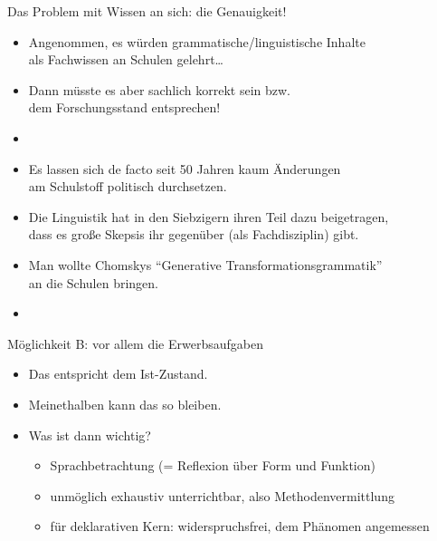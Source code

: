 \begin{frame}
  {Das Problem mit Wissen an sich: die Genauigkeit!}
  \pause
  \begin{itemize}[<+->]
    \item Angenommen, es würden grammatische\slash linguistische Inhalte\\
      als Fachwissen an Schulen gelehrt\ldots
    \item \alert{Dann müsste es aber sachlich korrekt sein bzw.\\
      dem Forschungsstand entsprechen!}
      \Halbzeile
    \item {}
      \Zeile
    \item Es lassen sich de facto seit 50 Jahren kaum Änderungen\\
      am Schulstoff politisch durchsetzen.
    \item Die Linguistik hat in den Siebzigern ihren Teil dazu beigetragen,\\
      dass es große Skepsis ihr gegenüber (als Fachdisziplin) gibt.
    \item Man wollte Chomskys "`Generative Transformationsgrammatik"'\\
      an die Schulen bringen.
    \item {}
  \end{itemize}
\end{frame}

\begin{frame}
  {Möglichkeit B: vor allem die Erwerbsaufgaben}
  \pause
  \begin{itemize}[<+->]
    \item Das entspricht dem Ist-Zustand.
    \item Meinethalben kann das so bleiben.
      \Halbzeile
    \item Was ist dann wichtig?
      \begin{itemize}[<+->]
        \item \alert{Sprachbetrachtung} (= Reflexion über Form und Funktion)
        \item unmöglich exhaustiv unterrichtbar, also \alert{Methodenvermittlung}
        \item für deklarativen Kern: \alert{widerspruchsfrei, dem Phänomen angemessen}
      \end{itemize}
  \end{itemize}
\end{frame}



